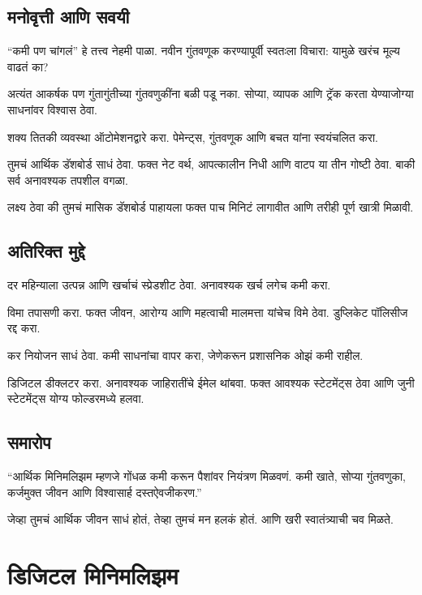 \section*{मनोवृत्ती आणि सवयी}

“कमी पण चांगलं” हे तत्त्व नेहमी पाळा. नवीन गुंतवणूक करण्यापूर्वी स्वतःला विचारा: यामुळे खरंच मूल्य वाढतं का?

अत्यंत आकर्षक पण गुंतागुंतीच्या गुंतवणुकींना बळी पडू नका. सोप्या, व्यापक आणि ट्रॅक करता येण्याजोग्या साधनांवर विश्वास ठेवा.

शक्य तितकी व्यवस्था ऑटोमेशनद्वारे करा. पेमेन्ट्स, गुंतवणूक आणि बचत यांना स्वयंचलित करा.

तुमचं आर्थिक डॅशबोर्ड साधं ठेवा. फक्त नेट वर्थ, आपत्कालीन निधी आणि वाटप या तीन गोष्टी ठेवा.
बाकी सर्व अनावश्यक तपशील वगळा.

लक्ष्य ठेवा की तुमचं मासिक डॅशबोर्ड पाहायला फक्त पाच मिनिटं लागावीत आणि तरीही पूर्ण खात्री मिळावी.



\section*{अतिरिक्त मुद्दे}

दर महिन्याला उत्पन्न आणि खर्चाचं स्प्रेडशीट ठेवा. अनावश्यक खर्च लगेच कमी करा.

विमा तपासणी करा. फक्त जीवन, आरोग्य आणि महत्वाची मालमत्ता यांचेच विमे ठेवा. डुप्लिकेट पॉलिसीज रद्द करा.

कर नियोजन साधं ठेवा. कमी साधनांचा वापर करा, जेणेकरून प्रशासनिक ओझं कमी राहील.

डिजिटल डीक्लटर करा. अनावश्यक जाहिरातींचे ईमेल थांबवा. फक्त आवश्यक स्टेटमेंट्स ठेवा आणि जुनी स्टेटमेंट्स योग्य फोल्डरमध्ये हलवा.

\section*{समारोप}

“आर्थिक मिनिमलिझम म्हणजे गोंधळ कमी करून पैशांवर नियंत्रण मिळवणं. कमी खाते, सोप्या गुंतवणुका, कर्जमुक्त जीवन आणि विश्वासार्ह दस्तऐवजीकरण.”


जेव्हा तुमचं आर्थिक जीवन साधं होतं, तेव्हा तुमचं मन हलकं होतं. आणि खरी स्वातंत्र्याची चव मिळते.


\chapter{डिजिटल मिनिमलिझम}


